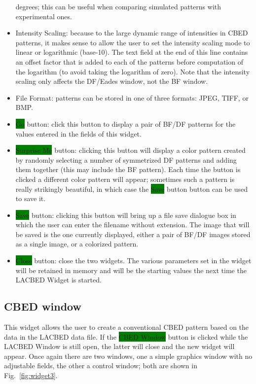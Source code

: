 \documentclass[DIV=calc, paper=letter, fontsize=11pt]{scrartcl}	 %
\newcommand{\button}[1]{\colorbox{green}{\textsf{#1}} button}
\begin{document}
\begin{itemize}
	degrees; this can be useful when comparing simulated patterns with experimental ones.
	\item \textsf{Intensity Scaling}: because to the large dynamic range of intensities in CBED patterns, it makes sense to allow the user
	to set the intensity scaling mode to linear or logarithmic (base-10).  The text field at the end of this line contains an offset
	factor that is added to each of the patterns before computation of the logarithm (to avoid taking the logarithm of zero). Note that 
	the intensity scaling only affects the DF/Eades window, not the BF window.
	\item \textsf{File Format}: patterns can be stored in one of three formats: JPEG, TIFF, or BMP.
	\item \button{Go}: click this button to display a pair of BF/DF patterns for the values entered in the fields of this widget.
	\item \button{Surprise Me}: clicking this button will display a color pattern created by randomly selecting a number of 
	symmetrized DF patterns and adding them together (this may include the BF pattern).  Each time the button is clicked a different color pattern will appear;
	sometimes such a pattern is really strikingly beautiful, in which case the \button{Save} button can be used to save it.
	\item \button{Save}: clicking this button will bring up a file save dialogue box in which the user can enter the filename
	without extension.  The image that will be saved is the one currently displayed, either a pair of BF/DF images stored as a 
	single image, or a colorized pattern.
	\item \button{Close}: close the two widgets.  The various parameters set in the widget will be retained in memory and 
	will be the starting values the next time the LACBED Widget is started.
\end{itemize}


\subsection{CBED window\label{sec:idlcbed}}
This widget allows the user to create a conventional CBED pattern based on the data in the LACBED data file.  If the \button{CBED Window} is clicked
while the LACBED Window is still open, the latter will close and the new widget will appear.  Once again there are two windows, one a simple 
graphics window with no adjustable fields, the other a control window; both are shown in Fig.~\ref{fig:widget3}.
\end{document}
